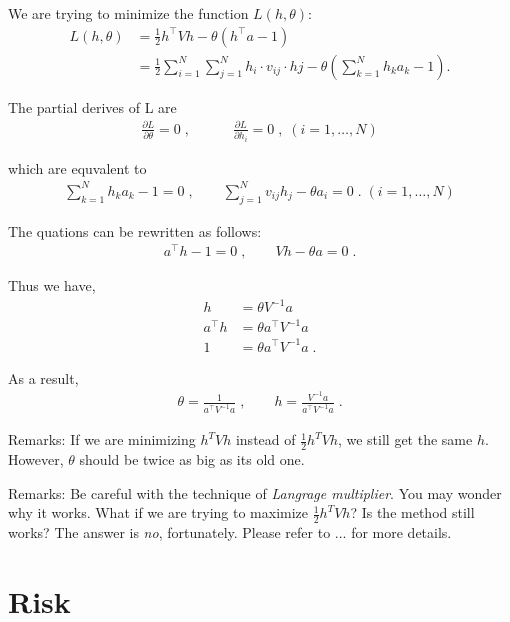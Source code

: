 \documentclass[12pt,a4paper]{report}
\begin{document}
We are trying to minimize the function $L( h, \theta)$:
\begin{align*}
    L( h, \theta ) &= \frac{1}{2} h^\top V h - \theta ( h^\top a - 1) \\
    &= \frac{1}{2} \sum_{i=1}^N \sum_{j=1}^N h_i \cdot v_{ij} \cdot hj -
        \theta \left( \sum_{k=1}^N h_k a_k - 1 \right).
\end{align*}

The partial derives of L are
\begin{align*}
    \frac{\partial L}{\partial \theta}  = 0 \;, \qquad
    \quad
    \frac{\partial L}{\partial h_i}     = 0 \;, \; ( i = 1, \ldots, N )
\end{align*}

which are equvalent to
\begin{align*}
    \sum_{k=1}^N h_k a_k - 1                = 0 \;, \qquad
    \sum_{j=1}^N v_{ij} h_j - \theta a_i    = 0 \;.  \; ( i = 1, \ldots, N )
\end{align*}

The quations can be rewritten as follows:
\begin{align}
    a^\top h  - 1       = 0 \;, \qquad
    V h - \theta a  = 0 \;.
\end{align}

Thus we have,
\begin{align*}
    h           &= \theta V^{-1} a \\
    a^\top h    &= \theta a^\top V^{-1} a \\
    1           &= \theta a^\top V^{-1} a \;.
\end{align*}

As a result,
\begin{align*}
    \theta = \frac{1}{ a^\top V^{-1} a} \;, \qquad
    h      = \frac{V^{-1} a}{ a^\top V^{-1} a} \;.
\end{align*}

Remarks: If we are minimizing $h^T V h$ instead of $\frac{1}{2} h^T V h$,
we still get the same $h$.
However, $\theta$ should be twice as big as its old one.

Remarks: Be careful with the technique of \emph{Langrage multiplier}.
You may wonder why it works.
What if we are trying to maximize $\frac{1}{2} h^T V h$?
Is the method still works?
The answer is \emph{no}, fortunately.
Please refer to ... for more details.


\chapter{Risk}
\end{document}
